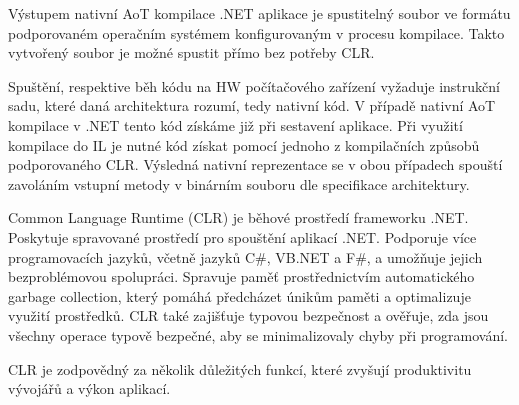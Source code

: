 Výstupem nativní AoT kompilace .NET aplikace je spustitelný soubor ve formátu podporovaném operačním systémem konfigurovaným v procesu kompilace. Takto vytvořený soubor je možné spustit přímo bez potřeby CLR. 


Spuštění, respektive běh kódu na HW počítačového zařízení vyžaduje instrukční sadu, které daná architektura rozumí, tedy nativní kód. V případě nativní AoT kompilace v .NET tento kód získáme již při sestavení aplikace. Při využití kompilace do IL je nutné kód získat pomocí jednoho z kompilačních způsobů podporovaného CLR. Výsledná nativní reprezentace se v obou případech spouští zavoláním vstupní metody v binárním souboru dle specifikace architektury.


Common Language Runtime (CLR) je běhové prostředí frameworku .NET. Poskytuje spravované prostředí pro spouštění aplikací .NET. Podporuje více programovacích jazyků, včetně jazyků C\#, VB.NET a F\#, a umožňuje jejich bezproblémovou spolupráci. Spravuje paměť prostřednictvím automatického garbage collection, který pomáhá předcházet únikům paměti a optimalizuje využití prostředků. CLR také zajišťuje typovou bezpečnost a ověřuje, zda jsou všechny operace typově bezpečné, aby se minimalizovaly chyby při programování.

CLR je zodpovědný za několik důležitých funkcí, které zvyšují produktivitu vývojářů a výkon aplikací.

